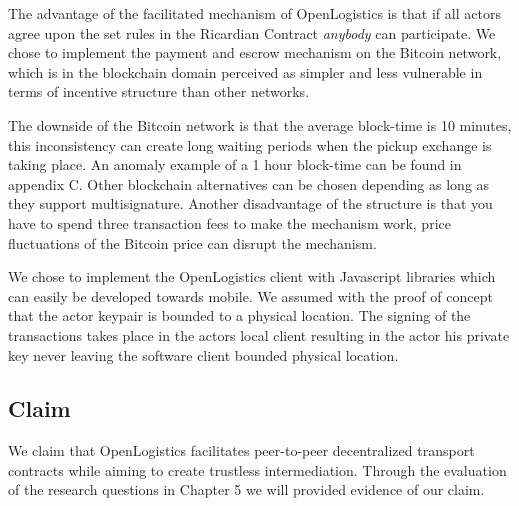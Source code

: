 The advantage of the facilitated mechanism of OpenLogistics is that if all actors agree upon the set rules in the Ricardian Contract \textit{anybody} can participate. We chose to implement the payment and escrow mechanism on the Bitcoin network, which is in the blockchain domain perceived as simpler and less vulnerable in terms of incentive structure than other networks. \par
The downside of the Bitcoin network is that the average block-time is 10 minutes, this inconsistency can create long waiting periods when the pickup exchange is taking place. An anomaly example of a 1 hour block-time can be found in appendix C. Other blockchain alternatives can be chosen depending as long as they support multisignature. Another disadvantage of the structure is that you have to spend three transaction fees to make the mechanism work, price fluctuations of the Bitcoin price can disrupt the mechanism.\par
We chose to implement the OpenLogistics client with Javascript libraries which can easily be developed towards mobile. We assumed with the proof of concept that the actor keypair is bounded to a physical location. The signing of the transactions takes place in the actors local client resulting in the actor his private key never leaving the software client bounded physical location.

\subsection{Claim}

We claim that OpenLogistics facilitates peer-to-peer decentralized transport contracts while aiming to create trustless intermediation. Through the evaluation of the research questions in Chapter 5 we will provided evidence of our claim.
